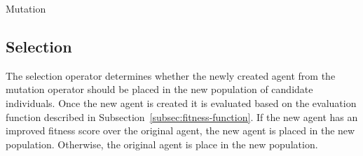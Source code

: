 \begin{algorithm}
	\caption{Mutation}
	\label{alg:de-mutation}
	\begin{algorithmic}

			\ENDFOR
		\ENDFOR

	\end{algorithmic}
\end{algorithm}

\subsection{Selection}
\label{subsec:de-selection}

The selection operator determines whether the newly created agent from the mutation operator should be placed in the new population of candidate individuals. Once the new agent is created it is evaluated based on the evaluation function described in Subsection~\ref{subsec:fitness-function}. If the new agent has an improved fitness score over the original agent, the new agent is placed in the new population. Otherwise, the original agent is place in the new population.
